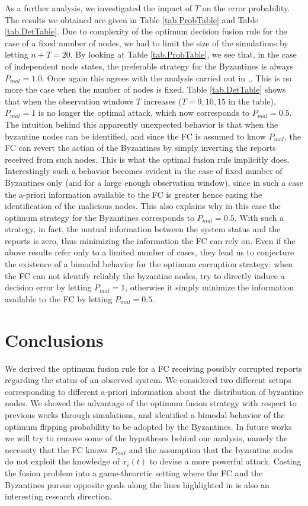 \documentclass[10pt,peerreview,draftcls,onecolumn]{IEEEtran}
\begin{document}
As a further analysis, we investigated the impact of $T$ on the error probability. The results we obtained are given in Table \ref{tab.ProbTable} and Table \ref{tab.DetTable}. Due to complexity of the optimum decision fusion rule for the case of a fixed number of nodes, we had to limit the size of the simulations by letting $n+T=20$.
By looking at Table \ref{tab.ProbTable}, we see that, in the case of independent node states, the preferable strategy for the Byzantines is always $P_{mal}=1.0$. Once again this agrees with  the analysis carried out in \cite{CDC},\cite{KBKV13}.
This is no more the case when the number of nodes is fixed. Table \ref{tab.DetTable} shows that when the observation windows $T$ increases ($T = 9, 10, 15$ in the table), $P_{mal}=1$ is no longer the optimal attack, which now corresponds to $P_{mal} = 0.5$. The intuition behind this apparently unexpected behavior is that when the byzantine nodes can be identified, and since the FC is assumed to know $P_{mal}$, the FC can revert the action of the Byzantines by simply inverting the reports received from such nodes. This is what the optimal fusion rule implicitly does. Interestingly such a behavior becomes evident in the case of fixed number of Byzantines only (and for a large enough observation window), since in such a case the a-priori information available to the FC is greater hence easing the identification of the malicious nodes. This also explains why in this case the optimum strategy for the Byzantines corresponds to $P_{mal} = 0.5$. With such a strategy, in fact, the mutual information between the system status and the reports is zero, thus minimizing the information the FC can rely on. Even if the above results refer only to a limited number of cases, they lead us to conjecture the existence of a bimodal behavior for the optimum corruption strategy: when the FC can not identify reliably the byzantine nodes, try to directly induce a decision error by letting $P_{mal} = 1$, otherwise it simply minimize the information available to the FC by letting $P_{mal} = 0.5$.


\section{Conclusions}
\label{sec.conc}

We derived the optimum fusion rule for a FC receiving possibly corrupted reports regarding the status of an observed system. We considered two different setups corresponding to different a-priori information about the distribution of byzantine nodes. We showed the advantage of the optimum fusion strategy with respect to previous works through simulations, and identified a bimodal behavior of the optimum flipping probability to be adopted by the Byzantines. In future works we will try to remove some of the hypotheses behind our analysis, namely the necessity that the FC knows $P_{mal}$ and the assumption that the byzantine nodes do not exploit the knowledge of $x_i(t)$ to devise a more powerful attack. Casting the fusion problem into a game-theoretic setting where the FC and the Byzantines pursue opposite goals along the lines highlighted in \cite{BarGon13} is also an interesting research direction.


\end{document}
